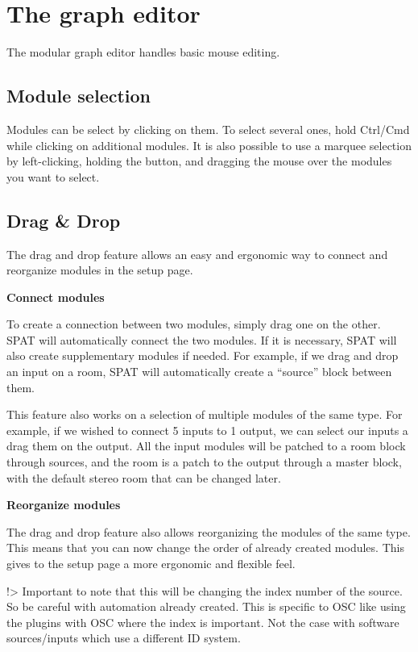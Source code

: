 \documentclass[
  letterpaper,
  DIV=11,
  numbers=noendperiod]{scrreport}
\begin{document}
\hypertarget{the-graph-editor}{%
\section{The graph editor}\label{the-graph-editor}}

The modular graph editor handles basic mouse editing.

\hypertarget{module-selection}{%
\subsection{Module selection}\label{module-selection}}

Modules can be select by clicking on them. To select several ones, hold
Ctrl/Cmd while clicking on additional modules. It is also possible to
use a marquee selection by left-clicking, holding the button, and
dragging the mouse over the modules you want to select.

\hypertarget{drag-drop}{%
\subsection{Drag \& Drop}\label{drag-drop}}

The drag and drop feature allows an easy and ergonomic way to connect
and reorganize modules in the setup page.

\textbf{Connect modules}

To create a connection between two modules, simply drag one on the
other. SPAT will automatically connect the two modules. If it is
necessary, SPAT will also create supplementary modules if needed. For
example, if we drag and drop an input on a room, SPAT will automatically
create a ``source'' block between them.

This feature also works on a selection of multiple modules of the same
type. For example, if we wished to connect 5 inputs to 1 output, we can
select our inputs a drag them on the output. All the input modules will
be patched to a room block through sources, and the room is a patch to
the output through a master block, with the default stereo room that can
be changed later.

\textbf{Reorganize modules}

The drag and drop feature also allows reorganizing the modules of the
same type. This means that you can now change the order of already
created modules. This gives to the setup page a more ergonomic and
flexible feel.

!\textgreater{} Important to note that this will be changing the index
number of the source. So be careful with automation already created.
This is specific to OSC like using the plugins with OSC where the index
is important. Not the case with software sources/inputs which use a
different ID system.
\end{document}
